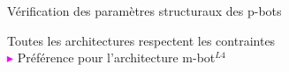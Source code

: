 \documentclass[french]{beamer}
\begin{document}
\begin{frame}{Vérification des paramètres structuraux des p-bots}
{
\scriptsize
\begin{alertblock}{}
\centering
Toutes les architectures respectent les contraintes\\
\textbf{\textcolor{magenta}{$\blacktriangleright$}} Préférence pour l'architecture m-bot$^{L4}$ %
\end{alertblock}
}
\end{frame}

%
\end{document}
